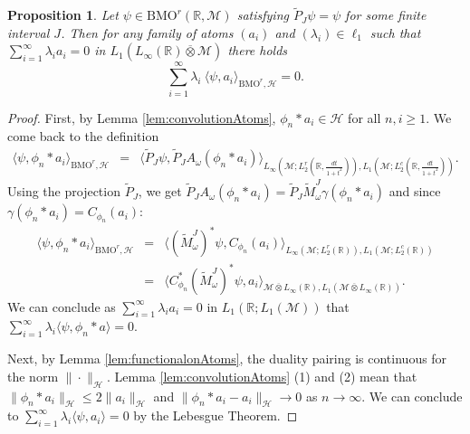 \documentclass[psamsfonts]{amsart}
\newtheorem{proposition}[theorem]{Proposition}
\newcommand{\R}{\mathbb{R}}
\newcommand{\la}{\langle}
\newcommand{\ra}{\rangle}
\newcommand{\Lone}{L_1}
\newcommand{\Linfty}{L_\infty}
\newcommand{\Ltwoc}{L_2^c}
\newcommand{\Ltwor}{L_2^r}
\newcommand{\BMOr}{\mathrm{BMO}^r}
\begin{document}
         
       \begin{proposition}\label{prop:BMOCompact}
         Let $\psi \in \BMOr(\mathbb{R},\mathcal{M})$ satisfying
         $\widetilde{P}_J \psi = \psi$ for some finite interval
         $J$. Then for any family of atoms $(a_i)$ and
         $(\lambda_i)\in \ell_1$ such that $\sum_{i=1}^\infty  \lambda_i a_i=0$ in  $\Lone(\Linfty(\mathbb{R}) \overline{\otimes} \mathcal{M})$ there holds
     $$            \sum_{i=1}^\infty  \lambda_i \ \langle \psi, a_i \rangle_{\BMOr,\mathcal H} = 0.$$
           \end{proposition}
    \begin{proof}
      First, by Lemma \ref{lem:convolutionAtoms}, $\phi_n* a_i\in \mathcal H$ for all $n, i\geq 1$. We come back to the definition
              \begin{eqnarray*}
          \langle \psi, \phi_n*a_i \rangle_{\BMOr,\mathcal H} &=&  \langle
\widetilde P_J \psi, \widetilde P_JA_\omega(\phi_n*a_i)
\rangle_{\Linfty(\mathcal{M};\Ltwor(\mathbb{R},\frac{dt}{1+t^2})),
  \Lone(\mathcal{M};\Ltwoc(\mathbb{R},\frac{dt}{1+t^2})) }.
         \end{eqnarray*}
Using the projection $\widetilde{P}_J$, we get 
         $\widetilde P_JA_\omega(\phi_n*a_i)=\widetilde P_J \widetilde
         M_\omega^J \gamma(\phi_n*a_i)$ and since $\gamma(\phi_n*a_i)=C_{\phi_n}(a_i)$:
 \begin{eqnarray*}
          \langle \psi, \phi_n*a_i \rangle_{\BMOr,\mathcal H} &=&  \langle
(\widetilde M_\omega^J)^* \psi, C_{\phi_n}(a_i)
\rangle_{\Linfty(\mathcal{M};\Ltwor(\mathbb{R})),
                                                                  \Lone(\mathcal{M};\Ltwoc(\mathbb{R})) }\\ &=&  \langle 
 C_{\phi_n}^*(\widetilde M_\omega^J)^* \psi, a_i
\rangle_{\mathcal{M}\overline \otimes \Linfty(\mathbb{R}),  \Lone(\mathcal{M}\overline \otimes \Linfty(\mathbb{R})) }.   
         \end{eqnarray*}
         We can conclude as $\sum_{i=1}^\infty \lambda_i a_i=0$ in $\Lone(\R; \Lone(\mathcal M))$ that $\sum_{i=1}^\infty \lambda_i\la \psi, \phi_n*a \ra=0$.

         Next, by Lemma \ref{lem:functionalonAtoms}, the duality
         pairing is continuous for the norm $\|\cdot\|_{\mathcal H}$. Lemma
       \ref{lem:convolutionAtoms} (1) and (2) mean that
       $\|\phi_n*a_i\|_{\mathcal H}\leq 2 \|a_i\|_{\mathcal H}$ and
   $\|\phi_n*a_i-a_i\|_{\mathcal H}\to 0$ as $n\to \infty$. We can conclude to     $\sum_{i=1}^\infty \lambda_i\la \psi, a_i \ra=0$ by the Lebesgue Theorem.
     \end{proof}
\end{document}
